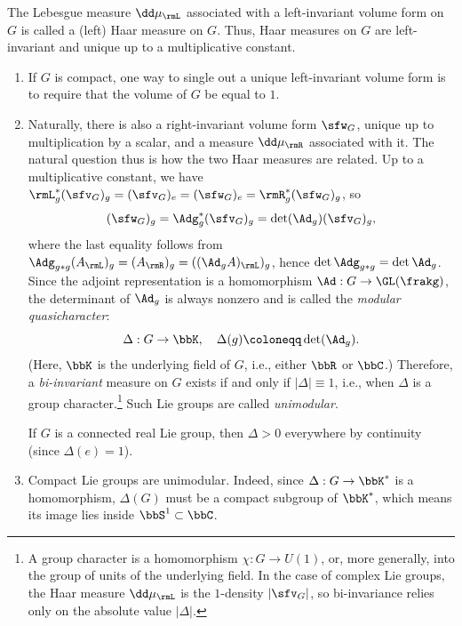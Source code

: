 \begin{defn}
    The Lebesgue measure $\dd\mu_\rmL$ associated with a left-invariant volume form on $G$ is called a (left) Haar measure on $G$. Thus, Haar measures on $G$ are left-invariant and unique up to a multiplicative constant.
\end{defn}

\begin{rem}\label{rem biinvariant measures}
    \begin{enumerate}
        \item If $G$ is compact, one way to single out a unique left-invariant volume form is to require that the volume of $G$ be equal to $1$.
        \item Naturally, there is also a right-invariant volume form $\sfw_G$, unique up to multiplication by a scalar, and a measure $\dd\mu_\rmR$ associated with it. The natural question thus is how the two Haar measures are related. Up to a multiplicative constant, we have $\rmL_g^\ast (\sfv_G)_g=(\sfv_G)_e=(\sfw_G)_e=\rmR_g^\ast (\sfw_G)_g$, so
        \[(\sfw_G)_g=\Adg_{g}^\ast (\sfv_G)_g=\det(\Ad_g)(\sfv_G)_g,\]
        where the last equality follows from $\Adg_{g\ast g}(A_\rmL)_g=(A_\rmR)_g=((\Ad_g A)_\rmL)_g$, hence $\det\Adg_{g\ast g}=\det\Ad_g$.
        Since the adjoint representation is a homomorphism $\Ad:G\to\GL(\frakg)$, the determinant of $\Ad_g$ is always nonzero and is called the \emph{modular quasicharacter}:
        \[\Delta: G\to \bbK,\quad \Delta(g)\coloneqq\det(\Ad_g).\]
        (Here, $\bbK$ is the underlying field of $G$, i.e., either $\bbR$ or $\bbC$.)
        Therefore, a \emph{bi-invariant} measure on $G$ exists if and only if $|\Delta|\equiv 1$, i.e., when $\Delta$ is a group character.\footnote{A group character is a homomorphism $\chi:G\to U(1)$, or, more generally, into the group of units of the underlying field. In the case of complex Lie groups, the Haar measure $\dd \mu_\rmL$ is the $1$-density $|\sfv_G|$, so bi-invariance relies only on the absolute value $|\Delta|$.} Such Lie groups are called \emph{unimodular}.
        
        If $G$ is a connected real Lie group, then $\Delta>0$ everywhere by continuity (since $\Delta(e)=1$). 
        \item Compact Lie groups are unimodular. Indeed, since $\Delta:G\to \bbK^\ast$ is a homomorphism, $\Delta(G)$ must be a compact subgroup of $\bbK^\ast$, which means its image lies inside $\bbS^1\subset\bbC$.
    \end{enumerate}
\end{rem}



